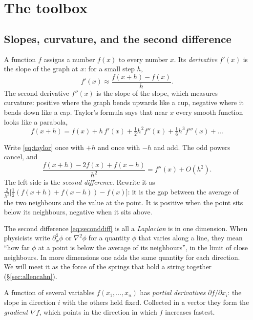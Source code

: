 \section{The toolbox}\label{sec:toolbox}

\subsection{Slopes, curvature, and the second difference}

A function $f$ assigns a number $f(x)$ to every number $x$. Its \emph{derivative} $f'(x)$ is the slope of
the graph at $x$: for a small step $h$,
\[
  f'(x)\approx\frac{f(x+h)-f(x)}{h}.
\]
The second derivative $f''(x)$ is the slope of the slope, which measures curvature: positive where the graph
bends upwards like a cup, negative where it bends down like a cap. Taylor's formula says that near $x$ every
smooth function looks like a parabola,
\begin{equation}\label{eq:taylor}
  f(x+h)=f(x)+h\,f'(x)+\tfrac{1}{2}h^2f''(x)+\tfrac16h^3f'''(x)+\dots
\end{equation}

Write \eqref{eq:taylor} once with $+h$ and once with $-h$ and add. The odd powers cancel, and
\begin{equation}\label{eq:seconddiff}
  \frac{f(x+h)-2f(x)+f(x-h)}{h^2}=f''(x)+O(h^2).
\end{equation}
The left side is the \emph{second difference}. Rewrite it as $\frac{2}{h^2}\big[\tfrac12(f(x+h)+f(x-h))-f(x)\big]$:
it is the gap between the average of the two neighbours and the value at the point. It is positive when the
point sits below its neighbours, negative when it sits above.

\begin{keyidea}
The second difference \eqref{eq:seconddiff} is all a \emph{Laplacian} is in one dimension. When physicists
write $\partial_x^2\phi$ or $\nabla^2\phi$ for a quantity $\phi$ that varies along a line, they mean ``how far
$\phi$ at a point is below the average of its neighbours'', in the limit of close neighbours. In more
dimensions one adds the same quantity for each direction. We will meet it as the force of the springs that
hold a string together (\S\ref{sec:allencahn}).
\end{keyidea}

A function of several variables $f(x_1,\dots,x_n)$ has \emph{partial derivatives} $\partial f/\partial x_i$:
the slope in direction $i$ with the others held fixed. Collected in a vector they form the \emph{gradient}
$\nabla f$, which points in the direction in which $f$ increases fastest.

